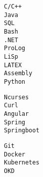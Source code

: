 \documentclass[9pt]{developercv} %
\begin{document}
\vspace{0.5cm}


\begin{minipage}[t]{0.3\textwidth}
	\vspace{-\baselineskip} %

	\begin{minipage}[t]{0.3\textwidth}
		\vspace{-\baselineskip} %
		
		
		{\texttt{C/C++}\\\texttt{Java}\\\texttt{SQL}\\\texttt{Bash}\\\texttt{.NET}\\\texttt{ProLog}\\\texttt{LiSp}\\\texttt{LATEX}\\\texttt{Assembly}\\\texttt{Python}}
	\end{minipage}
\end{minipage}
\hfill
\begin{minipage}[t]{0.3\textwidth}
	\vspace{-\baselineskip} %
	
	
	{\texttt{Ncurses}\\\texttt{Curl}\\\texttt{Angular}\\\texttt{Spring}\\\texttt{Springboot}}
\end{minipage}
\hfill
\begin{minipage}[t]{0.3\textwidth}
	\vspace{-\baselineskip} %
	
	
	{\texttt{Git}\\\texttt{Docker}\\\texttt{Kubernetes}\\\texttt{OKD}}
\end{minipage}
\end{document}
